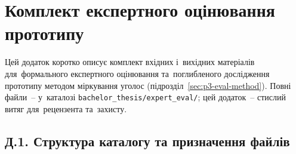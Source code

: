 \clearpage
\section{Комплект експертного оцінювання прототипу}
\label{app:expert_eval}

Цей додаток коротко описує комплект вхідних і~вихідних матеріалів для~формального експертного оцінювання та~поглибленого дослідження прототипу методом міркування уголос (підрозділ~\ref{sec:p3-eval-method}). Повні файли~-- у~каталозі \texttt{bachelor\_thesis/expert\_eval/}; цей додаток~-- стислий витяг для~рецензента та~захисту.

\subsection*{Д.1. Структура каталогу та призначення файлів}
\label{app:eval-structure}

